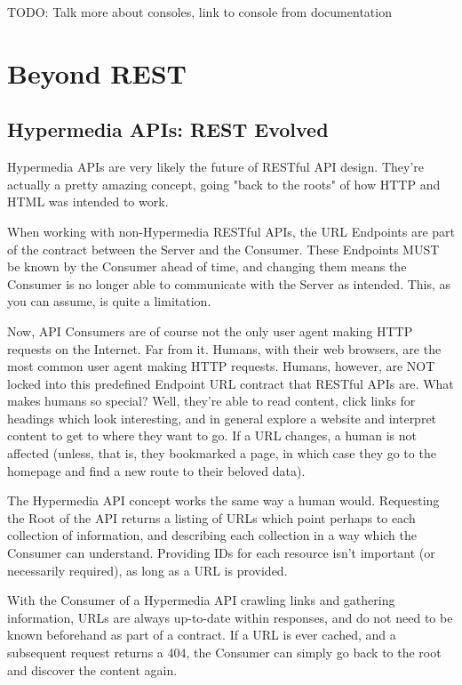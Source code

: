 \documentclass{book}
\begin{document}
TODO: Talk more about consoles, link to console from documentation


\chapter{Beyond REST}

\section{Hypermedia APIs: REST Evolved}

Hypermedia APIs are very likely the future of RESTful API design. They're actually a pretty amazing concept, going "back to the roots" of how HTTP and HTML was intended to work.

When working with non-Hypermedia RESTful APIs, the URL Endpoints are part of the contract between the Server and the Consumer. These Endpoints MUST be known by the Consumer ahead of time, and changing them means the Consumer is no longer able to communicate with the Server as intended. This, as you can assume, is quite a limitation.

Now, API Consumers are of course not the only user agent making HTTP requests on the Internet. Far from it. Humans, with their web browsers, are the most common user agent making HTTP requests. Humans, however, are NOT locked into this predefined Endpoint URL contract that RESTful APIs are. What makes humans so special? Well, they're able to read content, click links for headings which look interesting, and in general explore a website and interpret content to get to where they want to go. If a URL changes, a human is not affected (unless, that is, they bookmarked a page, in which case they go to the homepage and find a new route to their beloved data).

The Hypermedia API concept works the same way a human would. Requesting the Root of the API returns a listing of URLs which point perhaps to each collection of information, and describing each collection in a way which the Consumer can understand. Providing IDs for each resource isn't important (or necessarily required), as long as a URL is provided.

With the Consumer of a Hypermedia API crawling links and gathering information, URLs are always up-to-date within responses, and do not need to be known beforehand as part of a contract. If a URL is ever cached, and a subsequent request returns a 404, the Consumer can simply go back to the root and discover the content again.
\end{document}
